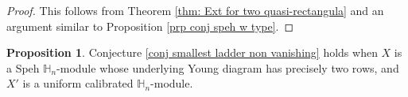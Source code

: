 \documentclass[11pt]{amsart}
\numberwithin{equation}{section}
\theoremstyle{definition}
\newtheorem{lemma}[thm]{Lemma}
\newtheorem{proposition}[thm]{Proposition}
\begin{document}
\begin{proof}
This follows from Theorem \ref{thm: Ext for two quasi-rectangula} and an argument similar to Proposition \ref{prp conj speh w type}.
\end{proof}








\begin{proposition} \label{prop conj two row speh}
Conjecture \ref{conj smallest ladder non vanishing} holds when $X$ is a Speh $\mathbb H_n$-module whose underlying Young diagram has precisely two rows, and $X'$ is a uniform calibrated $\mathbb H_n$-module.
\end{proposition}
\end{document}

